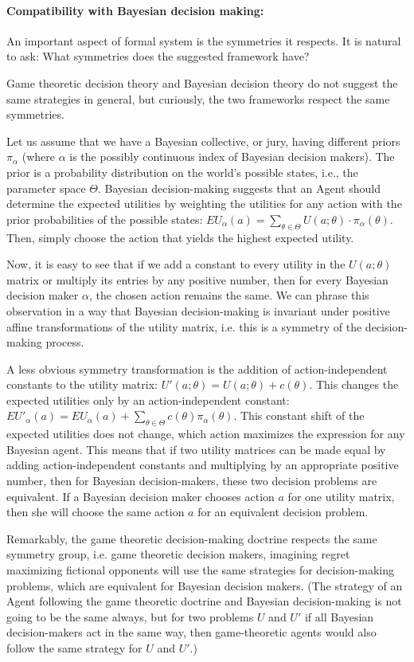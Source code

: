 \documentclass{article}
\begin{document}
\paragraph{Compatibility with Bayesian decision making:}
An important aspect of formal system is the symmetries it respects.
It is natural to ask: What symmetries does the suggested framework have?

Game theoretic decision theory and Bayesian decision theory do not suggest the same strategies in general, but curiously, the two frameworks respect the same symmetries.

Let us assume that we have a Bayesian collective, or jury, having different priors $\pi_\alpha$ (where $\alpha$ is the possibly continuous index of Bayesian decision makers).
The prior is a probability distribution on the world's possible states, i.e., the parameter space $\Theta$.
Bayesian decision-making suggests that an Agent should determine the expected utilities by weighting the utilities for any action with the prior probabilities of the possible states: $EU_\alpha(a) = \sum_{\theta \in \Theta} U(a;\theta) \cdot \pi_\alpha(\theta)$. Then, simply choose the action that yields the highest expected utility.

Now, it is easy to see that if we add a constant to every utility in the $U(a;\theta)$ matrix or multiply its entries by any positive number, then for every Bayesian decision maker $\alpha$, the chosen action remains the same.
We can phrase this observation in a way that Bayesian decision-making is invariant under positive affine transformations of the utility matrix, i.e. this is a symmetry of the decision-making process.

A less obvious symmetry transformation is the addition of action-independent constants to the utility matrix: $U'(a;\theta) = U(a;\theta) + c(\theta)$. This changes the expected utilities only by an action-independent constant: $EU'_\alpha(a)=EU_\alpha(a)+\sum_{\theta \in \Theta} c(\theta) \pi_\alpha(\theta)$.
This constant shift of the expected utilities does not change, which action maximizes the expression for any Bayesian agent.
This means that if two utility matrices can be made equal by adding action-independent constants and multiplying by an appropriate positive number, then for Bayesian decision-makers, these two decision problems are equivalent. If a Bayesian decision maker chooses action $a$ for one utility matrix, then she will choose the same action $a$ for an equivalent decision problem.

Remarkably, the game theoretic decision-making doctrine respects the same symmetry group, i.e. game theoretic decision makers, imagining regret maximizing fictional opponents will use the same strategies for decision-making problems, which are equivalent for Bayesian decision makers. (The strategy of an Agent following the game theoretic doctrine and Bayesian decision-making is not going to be the same always, but for two problems $U$ and $U'$ if all Bayesian decision-makers act in the same way, then game-theoretic agents would also follow the same strategy for $U$ and $U'$.)
\end{document}
